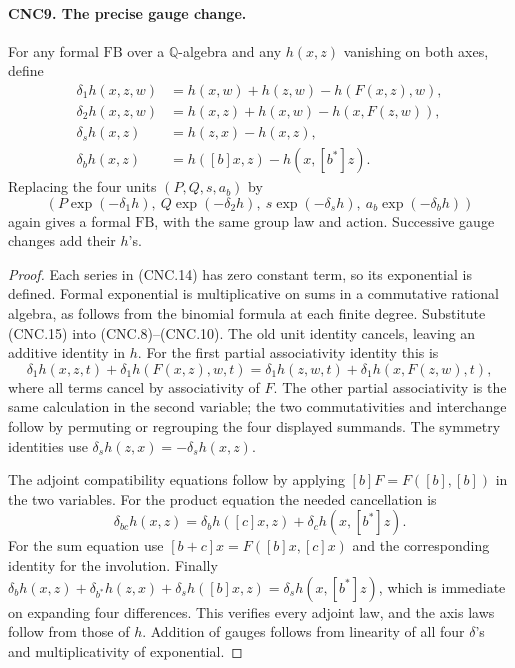 \documentclass[11pt,a4paper]{article}
\numberwithin{equation}{section}
\theoremstyle{remark}\newtheorem{remark}[theorem]{Remark}
\begin{document}
\paragraph{CNC9. The precise gauge change.}
\label{claim:CNC9}
For any formal \(\mathrm{FB}\) over a \(\mathbb Q\)-algebra
and any \(h(x,z)\) vanishing on both axes, define
\[
\begin{aligned}
 \delta_1h(x,z,w)&=h(x,w)+h(z,w)-h(F(x,z),w),\\
 \delta_2h(x,z,w)&=h(x,z)+h(x,w)-h(x,F(z,w)),\\
 \delta_sh(x,z)&=h(z,x)-h(x,z),\\
 \delta_bh(x,z)&=h([b]x,z)-h(x,[b^*]z).
\end{aligned}                                                   \tag{CNC.14}
\]
Replacing the four units \((P,Q,s,a_b)\) by
\[
 (P\exp(-\delta_1h),\ Q\exp(-\delta_2h),\
       s\exp(-\delta_sh),\ a_b\exp(-\delta_bh))               \tag{CNC.15}
\]
again gives a formal \(\mathrm{FB}\), with the same group law and
action.  Successive gauge changes add their \(h\)'s.
\begin{proof}
Each series in (CNC.14) has zero constant term, so its exponential is
defined.  Formal exponential is multiplicative on sums in a commutative
rational algebra, as follows from the binomial formula at each finite
degree.  Substitute (CNC.15) into (CNC.8)--(CNC.10).  The old unit
identity cancels, leaving an additive identity in \(h\).
For the first partial associativity identity this is
\[
 \delta_1h(x,z,t)+\delta_1h(F(x,z),w,t)
 =\delta_1h(z,w,t)+\delta_1h(x,F(z,w),t),
\]
where all terms cancel by associativity of \(F\).  The other
partial associativity is the same calculation in the second variable;
the two commutativities and interchange follow by permuting or
regrouping the four displayed summands.  The symmetry identities use
\(\delta_sh(z,x)=-\delta_sh(x,z)\).

The adjoint compatibility equations follow by applying
\([b]F=F([b],[b])\) in the two variables.  For the product equation
the needed cancellation is
\[
 \delta_{bc}h(x,z)=\delta_bh([c]x,z)
                         +\delta_ch(x,[b^*]z).
\]
For the sum equation use
\([b+c]x=F([b]x,[c]x)\) and the corresponding identity for the
involution.  Finally
\(\delta_bh(x,z)+\delta_{b^*}h(z,x)+\delta_sh([b]x,z)
=\delta_sh(x,[b^*]z)\), which is immediate on expanding four
differences.  This verifies every adjoint law, and the axis laws follow
from those of \(h\).  Addition of gauges follows from linearity of
all four \(\delta\)'s and multiplicativity of exponential.
\end{proof}
\end{document}

